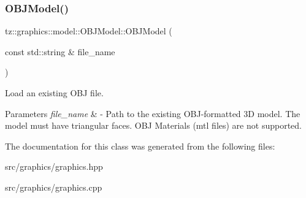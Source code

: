 \subsubsection{\texorpdfstring{O\+B\+J\+Model()}{OBJModel()}}
{\footnotesize\ttfamily tz\+::graphics\+::model\+::\+O\+B\+J\+Model\+::\+O\+B\+J\+Model (\begin{DoxyParamCaption}\item[{const std\+::string \&}]{file\+\_\+name }\end{DoxyParamCaption})}

Load an existing O\+BJ file. 
\begin{DoxyParams}{Parameters}
{\em file\+\_\+name} & -\/ Path to the existing O\+B\+J-\/formatted 3D model. The model must have triangular faces. O\+BJ Materials (mtl files) are not supported. \\
\hline
\end{DoxyParams}


The documentation for this class was generated from the following files\+:\begin{DoxyCompactItemize}
\item 
src/graphics/graphics.\+hpp\item 
src/graphics/graphics.\+cpp\end{DoxyCompactItemize}
